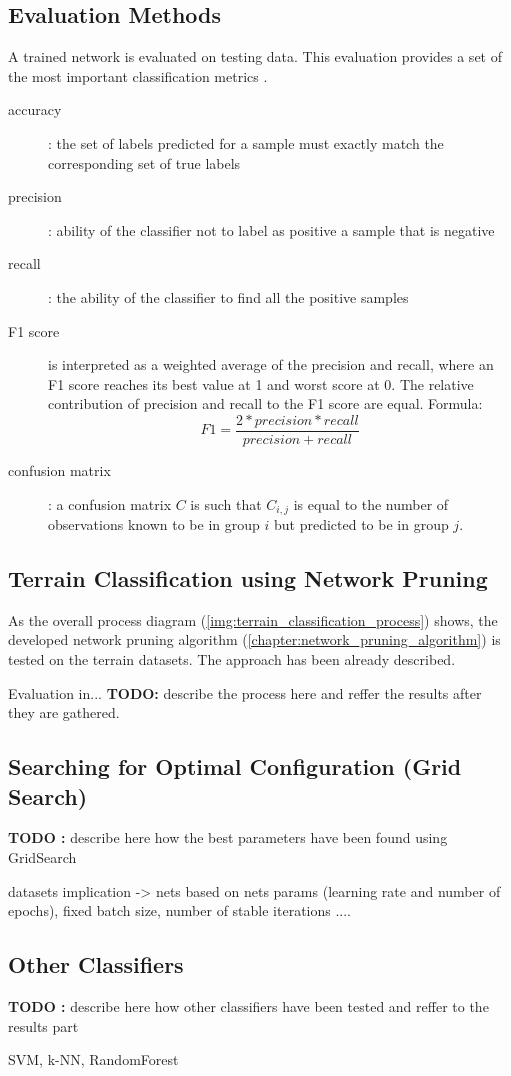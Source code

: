 \subsection{Evaluation Methods} \label{ssec:evaluation_methods}
A trained network is evaluated on testing data. This evaluation provides a set of the most important classification metrics \citep{article:scikit-learn}.

\begin{description}
\item[accuracy] : the set of labels predicted for a sample must exactly match the corresponding set of true labels
\item[precision] : ability of the classifier not to label as positive a sample that is negative
\item[recall] : the ability of the classifier to find all the positive samples
\item[F1 score] is interpreted as a weighted average of the precision and recall, where an F1 score reaches its best value at 1 and worst score at 0. The relative contribution of precision and recall to the F1 score are equal. Formula:
\begin{equation} \label{eq:f1_score}
F1 = \frac{2 * precision * recall}{precision + recall}
\end{equation}
\item[confusion matrix] : a confusion matrix $ C $ is such that $ C_{i, j} $ is equal to the number of observations known to be in group $ i $ but predicted to be in group $ j $.
\end{description}

\subsection{Terrain Classification using Network Pruning} \label{ssec:pruned_net_on_terrains}
As the overall process diagram (\cref{img:terrain_classification_process}) shows, the developed network pruning algorithm (\cref{chapter:network_pruning_algorithm}) is tested on the terrain datasets. The approach has been already described. 

Evaluation in... \textbf{TODO:} describe the process here and reffer the results after they are gathered.


\subsection{Searching for Optimal Configuration (Grid Search)} \label{ssec:grid_search}
\textbf{TODO :} describe here how the best parameters have been found using GridSearch

datasets implication -> nets based on nets params (learning rate and number of epochs), fixed batch size, number of stable iterations ....

\subsection{Other Classifiers} \label{ssec:other_classifiers}
\textbf{TODO :} describe here how other classifiers have been tested and reffer to the results part

SVM, k-NN, RandomForest